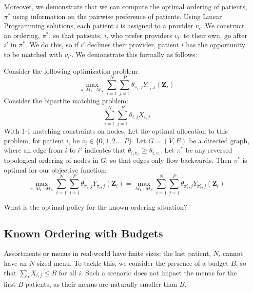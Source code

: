 Moreover, we demonstrate that we can compute the optimal ordering of patients, $\pi^{*}$ using information on the pairwise preference of patients. 
Using Linear Programming solutions, each patient $i$ is assigned to a provider $v_{i}$. 
We construct an ordering, $\pi^{*}$, so that patients, $i$, who prefer providers $v_{i'}$ to their own, go after $i'$ in $\pi^{*}$. 
We do this, so if $i'$ declines their provider, patient $i$ has the opportunity to be matched with $v_{i'}$. 
We demonstrate this formally as follows: 
\begin{lemma}
    Consider the following optimization problem: 
    \begin{equation}
        \max_{\pi,M_{1} \cdots M_{N}} \sum_{i=1}^{N} \sum_{j=1}^{P} \theta_{\pi_{i},j} Y_{\pi_{i},j}(\mathbf{Z}_{i})
    \end{equation}
    Consider the bipartite matching problem: 
    \begin{equation}
        \sum_{i=1}^{N} \sum_{j=1}^{P} \theta_{i,j} X_{i,j}
    \end{equation}
    With 1-1 matching constraints on nodes. 
    Let the optimal allocation to this problem, for patient $i$, be $v_{i} \in \{0,1,2\ldots,P\}$.  
    Let $G = (V,E)$ be a directed graph, where an edge from $i$ to $i'$ indicates that $\theta_{i,v_{i'}} \geq \theta_{i,v_{i}}$. 
    Let $\pi^{*}$ be any reversed topological ordering of nodes in $G$, so that edges only flow backwards. 
    Then $\pi^{*}$ is optimal for our objective function: 
    \begin{equation}
        \max_{\pi,M_{1} \cdots M_{N}} \sum_{i=1}^{N} \sum_{j=1}^{P} \theta_{\pi_{i},j} Y_{\pi_{i},j}(\mathbf{Z}_{i}) = \max_{M_{1} \cdots M_{N}} \sum_{i=1}^{N} \sum_{j=1}^{P} \theta_{\pi^{*}_{i},j} Y_{\pi^{*}_{i},j}(\mathbf{Z}_{i})
    \end{equation}

\end{lemma}

\begin{question}
    What is the optimal policy for the known ordering situation? 
\end{question}

\subsection{Known Ordering with Budgets}
Assortments or menus in real-world have finite sizes; the last patient, $N$, cannot have an $N$-sized menu. 
To tackle this, we consider the presence of a budget $B$, so that $\sum_{j} X_{i,j} \leq B$ for all $i$. 
Such a scenario does not impact the menus for the first $B$ patients, as their menus are naturally smaller than $B$. 

